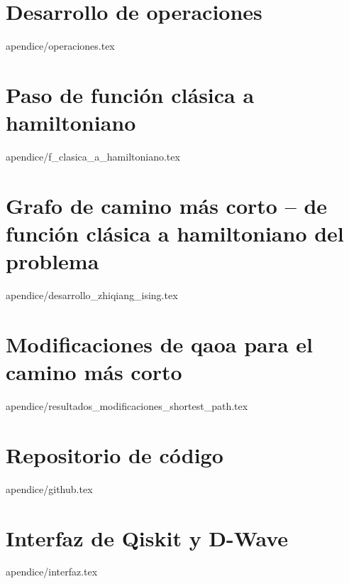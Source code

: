 \documentclass[epsbased,copyleft,final,printable,covers,extendedindex,firstnumbered,tfg,lof,lot]{tfgtfmthesisuam}
\begin{document}
\chapter{Desarrollo de operaciones}{apendice/operaciones.tex}
\chapter{Paso de función clásica a hamiltoniano\label{CAP:F_CLASICA_A_HAMILTONIANO}}{apendice/f_clasica_a_hamiltoniano.tex}
\chapter{Grafo de camino más corto {--} de función clásica a hamiltoniano del problema\label{CAP:DESARROLLO_ZHIQIANG_ISING}}{apendice/desarrollo_zhiqiang_ising.tex}
\chapter{Modificaciones de qaoa para el camino más corto\label{CAP:OTRAS_SOLUCIONES}}{apendice/resultados_modificaciones_shortest_path.tex}
\chapter{Repositorio de código\label{CAP:github}}{apendice/github.tex}
\chapter{Interfaz de Qiskit y D-Wave}{apendice/interfaz.tex}
\end{document}

